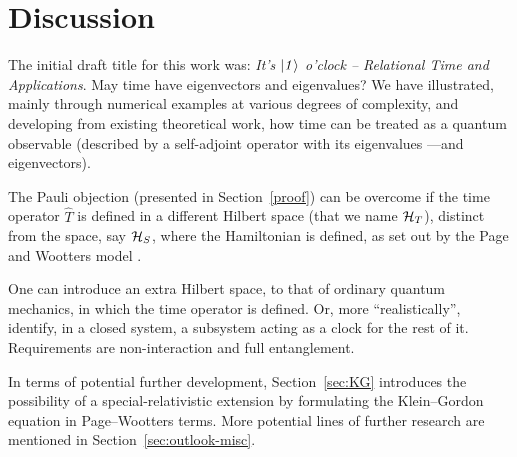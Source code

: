 \section{Discussion}

The initial draft title for this work was: 
\textit{It's $\it\ket{1}$ o'clock -- Relational Time and Applications}.
May time have eigenvectors and eigenvalues?
We have illustrated,
mainly through numerical examples
at various degrees of complexity,
and developing from existing theoretical work,
how time can be treated as a quantum observable
(described by a self-adjoint operator with its eigenvalues ---and eigenvectors).

The Pauli objection (presented in Section~\ref{proof})
can be overcome if the time operator $\hat{T}$
is defined in a different Hilbert space (that we name $\mathcal{H}_T$),
distinct from
the space, say $\mathcal{H}_S$, where the Hamiltonian is defined,
as set out by the Page and Wootters model
\parencite{PageWootters, Lloyd:Time, Marletto:Evolution, Maccone:QMOT, Maccone:Pauli}.

One can introduce an extra Hilbert space, to that of ordinary quantum mechanics,
in which the time operator is defined.
Or, more ``realistically'', identify, in a closed system, a subsystem
acting as a clock for the rest of it. Requirements are non-interaction and
full entanglement.

In terms of potential further development,
Section~\ref{sec:KG} introduces the possibility of a special-relativistic extension
by formulating the Klein--Gordon equation in Page--Wootters terms.
More potential lines of further research are mentioned in Section~\ref{sec:outlook-misc}.



